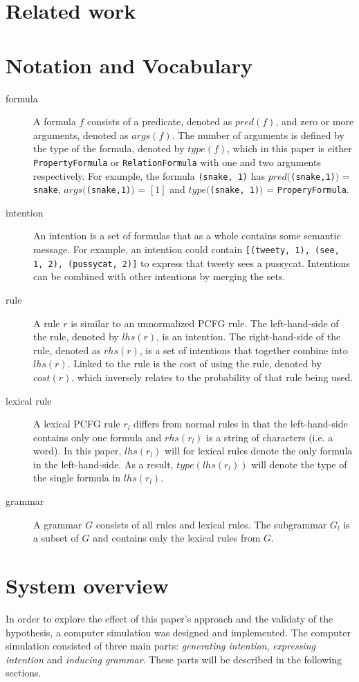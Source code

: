 \documentclass[a4paper]{article}
\begin{document}
\section{Related work}
\section{Notation and Vocabulary}
\begin{description}
    \item[formula] A formula $f$ consists of a predicate, denoted as $pred(f)$, and zero or more arguments, denoted as $args(f)$. The number of arguments is defined by the type of the formula, denoted by $type(f)$, which in this paper is either \verb|PropertyFormula| or \verb|RelationFormula| with one and two arguments respectively. For example, the formula \verb|(snake, 1)| has $pred($\verb|(snake,1)|$)$ = \verb|snake|, $args($\verb|(snake,1)|$)$ = $[1]$ and $type($\verb|(snake, 1)|$)$ = \verb|ProperyFormula|.
    \item[intention] An intention is a set of formulas that as a whole contains some semantic message. For example, an intention could contain \verb|[(tweety, 1), (see, 1, 2), (pussycat, 2)]| to express that tweety sees a pussycat. Intentions can be combined with other intentions by merging the sets.
    \item[rule] A rule $r$ is similar to an unnormalized PCFG rule. The left-hand-side of the rule, denoted by $lhs(r)$, is an intention. The right-hand-side of the rule, denoted as $rhs(r)$, is a set of intentions that together combine into $lhs(r)$. Linked to the rule is the cost of using the rule, denoted by $cost(r)$, which inversely relates to the probability of that rule being used.
    \item[lexical rule] A lexical PCFG rule $r_l$ differs from normal rules in that the left-hand-side contains only one formula and $rhs(r_l)$ is a string of characters (i.e. a word). In this paper, $lhs(r_l)$ will for lexical rules denote the only formula in the left-hand-side. As a result, $type(lhs(r_l))$ will denote the type of the single formula in $lhs(r_l)$.
    \item[grammar] A grammar $G$ consists of all rules and lexical rules. The subgrammar $G_l$ is a subset of $G$ and contains only the lexical rules from $G$.
\end{description}
\section{System overview}
\label{sec:system_overview}
In order to explore the effect of this paper's approach and the validaty of the hypothesis, a computer simulation was designed and implemented. The computer simulation consisted of three main parts: \emph{generating intention}, \emph{expressing intention} and \emph{inducing grammar}. These parts will be described in the following sections.
\end{document}

